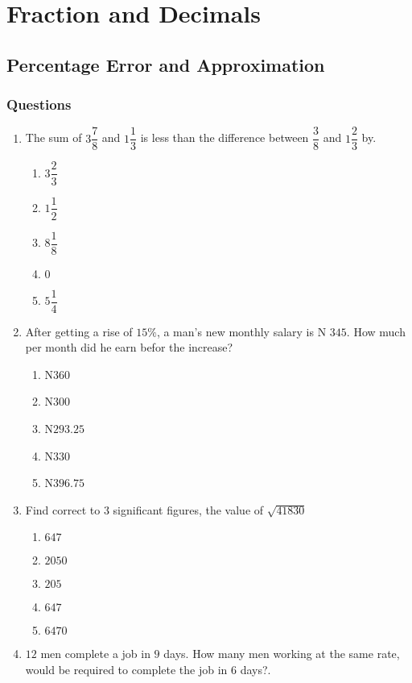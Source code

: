 \chapter{Fraction and Decimals}
\section{Percentage Error and Approximation}
\subsection{Questions}
\begin{multicols}{2}
\begin{enumerate}[label={\arabic*.}]
\item The sum of \(3 {\dfrac {7}{8}}\) and \(1{\dfrac{1}{3}}\) is less than the difference between \(\dfrac {3}{8}\) and \(1{\dfrac{2}{3}}\) by.
    \begin{enumerate}[label={\Alph*.}]
    \item \(3\dfrac{2}{3}\)
    \item \(1\dfrac{1}{2}\)
    \item \(8\dfrac{1}{8}\)
    \item \(0\)
    \item \(5\dfrac{1}{4}\)
    \end{enumerate}
\item  After getting a rise of \(15\%\), a man's new monthly salary is N \(345\). How much per month did he earn befor the increase? 
    \begin{enumerate}[label={\Alph*.}]
    \item N\(360\)
    \item N\(300\)
    \item N\(293.25\)
    \item N\(330\)
    \item N\(396.75\)
    \end{enumerate}
\item Find correct to \(3\) significant figures, the value of \(\sqrt{41830}\)
    \begin{enumerate}[label={\Alph*.}]
    \item \(647\)
    \item \(2050\)
    \item \(205\)
    \item \(647\)
    \item \(6470\)
    \end{enumerate}
\item \(12\) men complete a job in \(9\) days. How many men working at the same rate, would be required to complete the job in \(6\) days?. 

\end{enumerate}
\end{multicols}
